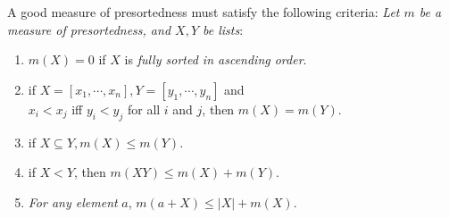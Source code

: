 \documentclass[twocolumn]{article}
\renewcommand{\leq}{\leqslant}
\begin{document}
A good measure of presortedness must satisfy the following criteria:
\noindent \emph{Let $m$ be a measure of presortedness, and $X, Y$ be lists}:
\begin{enumerate}
    \item $m(X) = 0$ if $X$ is \emph{fully sorted in ascending order}.
    \item if $X = [x_1, \cdots, x_n], Y= [y_1, \cdots, y_n]$ and \\
    $x_i < x_j$ iff $y_i < y_j$ for all $i$ and $j$, then $m(X) = m(Y)$. 
    \item if $X \subseteq Y, m(X) \leq m(Y)$.
    \item if $X < Y$, then $m(XY) \leq m(X) + m(Y)$.
    \item \emph{For any element} $a$, $m(a + X) \leq |X| + m(X)$.
\end{enumerate}



\end{document}
